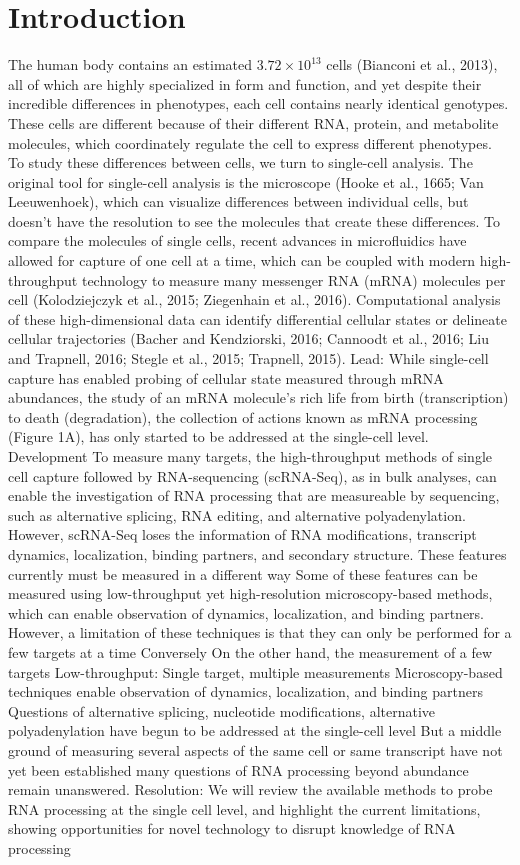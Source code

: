 \section{Introduction}
The human body contains an estimated $3.72 \times 10^{13}$ cells (Bianconi et al., 2013), all of which are highly specialized in form and function, and yet despite their incredible differences in phenotypes, each cell contains nearly identical genotypes. These cells are different because of their different RNA, protein, and metabolite molecules, which coordinately regulate the cell to express different phenotypes. To study these differences between cells, we turn to single-cell analysis.
The original tool for single-cell analysis is the microscope (Hooke et al., 1665; Van Leeuwenhoek), which can visualize differences between individual cells, but doesn’t have the resolution to see the molecules that create these differences. To compare the molecules of single cells, recent advances in microfluidics have allowed for capture of one cell at a time, which can be coupled with modern high-throughput technology to measure many messenger RNA (mRNA) molecules per cell (Kolodziejczyk et al., 2015; Ziegenhain et al., 2016). Computational analysis of these high-dimensional data can identify differential cellular states or delineate cellular trajectories (Bacher and Kendziorski, 2016; Cannoodt et al., 2016; Liu and Trapnell, 2016; Stegle et al., 2015; Trapnell, 2015).
Lead:
While single-cell capture has enabled probing of cellular state measured through mRNA abundances, the study of an mRNA molecule’s rich life from birth (transcription) to death (degradation), the collection of actions known as mRNA processing (Figure 1A), has only started to be addressed at the single-cell level.
Development
To measure many targets, the high-throughput methods of single cell capture followed by RNA-sequencing (scRNA-Seq), as in bulk analyses, can enable the investigation of RNA processing that are measureable by sequencing, such as alternative splicing, RNA editing, and alternative polyadenylation.
However, scRNA-Seq loses the information of RNA modifications, transcript dynamics, localization, binding partners, and secondary structure.
These features currently must be measured in a different way
Some of these features can be measured using low-throughput yet high-resolution microscopy-based methods, which can enable observation of dynamics, localization, and binding partners.
However, a limitation of these techniques is that they can only be performed for a few targets at a time
Conversely
On the other hand, the measurement of a few targets
Low-throughput: Single target, multiple measurements
Microscopy-based techniques enable observation of dynamics, localization, and binding partners
Questions of alternative splicing, nucleotide modifications, alternative polyadenylation have begun to be addressed at the single-cell level
But a middle ground of measuring several aspects of the same cell or same transcript have not yet been established
many questions of RNA processing beyond abundance remain unanswered.
Resolution:
We will review the available methods to probe RNA processing at the single cell level, and highlight the current limitations, showing opportunities for novel technology to disrupt knowledge of RNA processing

